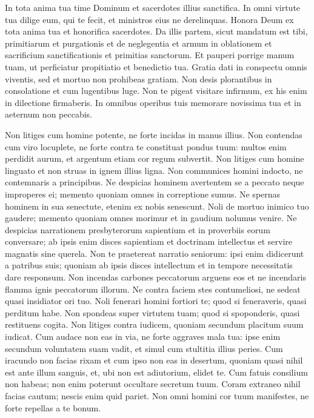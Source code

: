 \begin{biblechapter}
\begin{biblechapter}
\begin{biblechapter}
\begin{biblechapter}
\begin{biblechapter}
\begin{biblechapter}
\begin{biblechapter}
 \verse In tota anima tua time Dominum
 et sacerdotes illius sanctifica.
 \verse In omni virtute tua dilige eum, qui te fecit,
 et ministros eius ne derelinquas.
 \verse Honora Deum ex tota anima tua
 et honorifica sacerdotes.
 \verse Da illis partem, sicut mandatum est tibi,
 primitiarum et purgationis et de neglegentia
 \verse et armum in oblationem
 et sacrificium sanctificationis et primitias sanctorum.
 \verse Et pauperi porrige manum tuam,
 ut perficiatur propitiatio et benedictio tua.
 \verse Gratia dati in conspectu omnis viventis,
 sed et mortuo non prohibeas gratiam.
 \verse Non desis plorantibus in consolatione
 et cum lugentibus luge.
 \verse Non te pigeat visitare infirmum,
 ex his enim in dilectione firmaberis.
 \verse In omnibus operibus tuis memorare novissima tua
 et in aeternum non peccabis.
 
\begin{biblechapter}
\verse Non litiges cum homine potente,
 ne forte incidas in manus illius.
 \verse Non contendas cum viro locuplete,
 ne forte contra te constituat pondus tuum:
 \verse multos enim perdidit aurum,
 et argentum etiam cor regum subvertit.
 \verse Non litiges cum homine linguato
 et non struas in ignem illius ligna.
 \verse Non communices homini indocto,
 ne contemnaris a principibus.
 \verse Ne despicias hominem avertentem se a peccato
 neque improperes ei;
 memento quoniam omnes in correptione sumus.
 \verse Ne spernas hominem in sua senectute,
 etenim ex nobis senescunt.
 \verse Noli de mortuo inimico tuo gaudere;
 memento quoniam omnes morimur et in gaudium nolumus venire.
 \verse Ne despicias narrationem presbyterorum sapientium
 et in proverbiis eorum conversare;
 \verse ab ipsis enim disces sapientiam et doctrinam intellectus
 et servire magnatis sine querela.
 \verse Non te praetereat narratio seniorum:
 ipsi enim didicerunt a patribus suis;
 \verse quoniam ab ipsis disces intellectum
 et in tempore necessitatis dare responsum.
 \verse Non incendas carbones peccatorum arguens eos
 et ne incendaris flamma ignis peccatorum illorum.
 \verse Ne contra faciem stes contumeliosi,
 ne sedeat quasi insidiator ori tuo.
 \verse Noli fenerari homini fortiori te;
 quod si feneraveris, quasi perditum habe.
 \verse Non spondeas super virtutem tuam;
 quod si spoponderis, quasi restituens cogita.
 \verse Non litiges contra iudicem,
 quoniam secundum placitum suum iudicat.
 \verse Cum audace non eas in via,
 ne forte aggraves mala tua:
 ipse enim secundum voluntatem suam vadit,
 et simul cum stultitia illius peries.
 \verse Cum iracundo non facias rixam
 et cum ipso non eas in desertum,
 quoniam quasi nihil est ante illum sanguis,
 et, ubi non est adiutorium, elidet te.
 \verse Cum fatuis consilium non habeas;
 non enim poterunt occultare secretum tuum.
 \verse Coram extraneo nihil facias cautum;
 nescis enim quid pariet.
 \verse Non omni homini cor tuum manifestes,
 ne forte repellas a te bonum.
 

\end{biblechapter}
\end{biblechapter}
\end{biblechapter}
\end{biblechapter}
\end{biblechapter}
\end{biblechapter}
\end{biblechapter}
\end{biblechapter}
